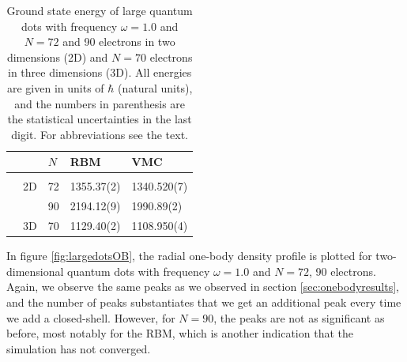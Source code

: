 \begin{table}
	\caption{Ground state energy of large quantum dots with frequency $\omega=1.0$ and $N=72$ and 90 electrons in two dimensions (2D) and $N=70$ electrons in three dimensions (3D). All energies are given in units of $\hbar$ (natural units), and the numbers in parenthesis are the statistical uncertainties in the last digit. For abbreviations see the text.}
	\label{tab:largeQD}
	\begin{tabularx}{\textwidth}{R{1.6cm}R{2cm}R{2cm}R{3cm}R{3cm}} \hline\hline
		& \makecell{\\ \phantom{$N$}} & $N$ & RBM & VMC \\ \hline \\
		& 2D & 72 & 1355.37(2) & 1340.520(7) \\
		&& 90 & 2194.12(9) & 1990.89(2) \\
		& 3D & 70 & 1129.40(2) & 1108.950(4) \\
		\hline \hline
	\end{tabularx}
\end{table}

In figure \eqref{fig:largedotsOB}, the radial one-body density profile is plotted for two-dimensional quantum dots with frequency $\omega=1.0$ and $N=72$, 90 electrons. Again, we observe the same peaks as we observed in section \ref{sec:onebodyresults}, and the number of peaks substantiates that we get an additional peak every time we add a closed-shell. However, for $N=90$, the peaks are not as significant as before, most notably for the RBM, which is another indication that the simulation has not converged.

